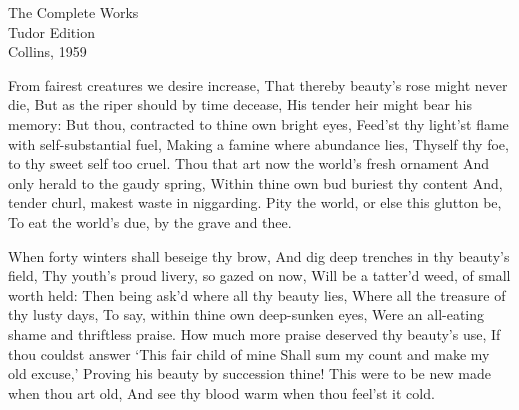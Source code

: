 \documentclass[twocolumn]{book}
\begin{document}
\onecolumn

              {The Complete Works \\
               Tudor Edition\\[.5ex]
               Collins, 1959}

\cleardoublepage
\pagestyle{maintext}
\thispagestyle{firstpage}

\twocolumn

\spatium {1\leading}


\Indexes

\versus

\Facies {}


From fairest creatures we desire increase,
That thereby beauty's rose might never die,
But as the riper should by time decease,
His tender heir might bear his memory:
But thou, contracted to thine own bright eyes,
Feed'st thy light'st flame with self-substantial fuel,
Making a famine where abundance lies,
Thyself thy foe, to thy sweet self too cruel.
Thou that art now the world's fresh ornament
And only herald to the gaudy spring,
Within thine own bud buriest thy content
And, tender churl, makest waste in niggarding.
  Pity the world, or else this glutton be,
  To eat the world's due, by the grave and thee.


When forty winters shall beseige thy brow,
And dig deep trenches in thy beauty's field,
Thy youth's proud livery, so gazed on now,
Will be a tatter'd weed, of small worth held:
Then being ask'd where all thy beauty lies, 
Where all the treasure of thy lusty days,
To say, within thine own deep-sunken eyes,
Were an all-eating shame and thriftless praise.
How much more praise deserved thy beauty's use,
If thou couldst answer `This fair child of mine
Shall sum my count and make my old excuse,'
Proving his beauty by succession thine!
  This were to be new made when thou art old,
  And see thy blood warm when thou feel'st it cold.
\end{document}
